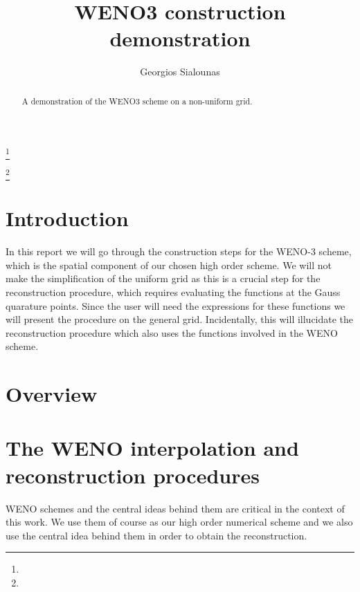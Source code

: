 \documentclass{amsart}
\theoremstyle{definition}
\theoremstyle{remark}
\numberwithin{equation}{section}
\begin{document}
	
	\title{WENO3 construction demonstration}
	
	
	\author{Georgios Sialounas}
	\address{}
	\curraddr{}
	\thanks{ }
	
	\author{}
	\address{}
	\curraddr{}
	\email{}
	\thanks{}
	
	
	\keywords{}
	
	\date{}
	
	\dedicatory{}
	
	\begin{abstract}
	A demonstration of the WENO3 scheme on a non-uniform grid.
	\end{abstract}
	
	\maketitle
	
	\section{Introduction}
	In this report we will go through the construction steps for the WENO-3 scheme, which is the spatial component of our chosen high order scheme. We will not make the simplification of the uniform grid as this is a crucial step for the reconstruction procedure, which requires evaluating the functions at the Gauss quarature points.  Since the user will need the expressions for these functions we will present the procedure on the general grid.  Incidentally, this will illucidate the reconstruction procedure which also uses the functions involved in the WENO scheme.
	
	\section{Overview}
	
	
	\section{The WENO interpolation and reconstruction procedures}
	WENO schemes and the central ideas behind them are critical in the context of this work.  We use them of course as our high order numerical scheme and we also use the central idea behind them in order to obtain the reconstruction.
	
\end{document}
